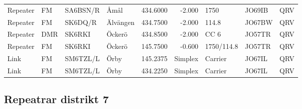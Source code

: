 {\begin{landscape}
\begin{longtable}{llllrrlll}
	Repeater          & FM              & SA6BSN/R & Åmål                  &     434.6000 &     -2.000 & 1750              & JO69IB      & QRV      \\
	Repeater          & FM              & SK6DQ/R  & Älvängen              &     434.7500 &     -2.000 & 114.8             & JO67BW      & QRV      \\
	Repeater          & DMR             & SK6RKI   & Öckerö                &     434.8500 &     -2.000 & CC 6              & JO57TR      & QRV      \\
	Repeater          & FM              & SK6RKI   & Öckerö                &     145.7500 &     -0.600 & 1750/114.8        & JO57TR      & QRV      \\
	Link              & FM              & SM6TZL/L & Örby                  &     145.2375 &    Simplex & Carrier           & JO67IL      & QRV      \\
	Link              & FM              & SM6TZL/L & Örby                  &     434.2250 &    Simplex & Carrier           & JO67IL      & QRV
\end{longtable}


\clearpage

\subsection{Repeatrar distrikt 7}


\end{landscape}}

